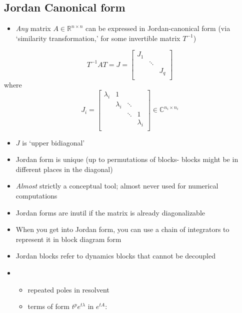\documentclass[10pt,letterpaper]{article}
\begin{document}
\subsection{Jordan Canonical form}
\label{sec-11_14}

\begin{itemize}
\item \emph{Any} matrix $A \in \mathbb{R}^{n\times n}$ can be expressed in Jordan-canonical form (via `similarity transformation,' for some invertible matrix $T ^{-1}$)
\end{itemize}
$$
T ^{-1} AT=J=
\begin{bmatrix}
  J_1 &        &     \\
      & \ddots &     \\
      &        & J_q \\
\end{bmatrix}
$$ 
where
$$
J_i =
\begin{bmatrix}
  \lambda_i &         1 &        &           \\
            & \lambda_i & \ddots &           \\
            &           & \ddots &         1 \\
            &           &        & \lambda_i \\
\end{bmatrix}
\in \mathbb C ^{n_i \times n_i}
$$ 
\begin{itemize}
\item $J$ is `upper bidiagonal'
\item Jordan form is unique (up to permutations of blocks- blocks might be in different places in the diagonal)
\item \emph{Almost} strictly a conceptual tool; almost never used for numerical computations
\item Jordan forms are inutil if the matrix is already diagonalizable
\item When you get into Jordan form, you can use a chain of integrators to represent it in block diagram form
\item Jordan blocks refer to dynamics blocks that cannot be decoupled
\item {}

\begin{itemize}
\item repeated poles in resolvent
\item terms of form $t ^{p} e ^{t\lambda}$ in $e ^{tA}$: 
\end{itemize}

\end{itemize}
\end{document}
